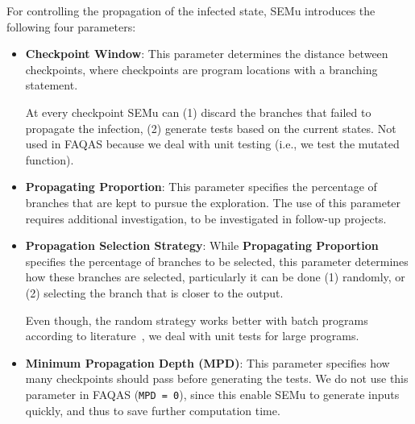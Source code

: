 \begin{itemize}
	
	For controlling the propagation of the infected state, SEMu introduces the following four parameters:
	\begin{itemize}

		\item \textbf{Checkpoint Window}: This parameter determines the distance between checkpoints, where checkpoints are program locations with a branching statement. 

		At every checkpoint SEMu can (1) discard the branches that failed to propagate the infection, (2) generate tests based on the current states. Not used in FAQAS because we deal with unit testing (i.e., we test the mutated function).
		
		\item \textbf{Propagating Proportion}: This parameter specifies the percentage of branches that are kept to pursue the exploration. The use of this parameter requires additional investigation, to be investigated in follow-up projects.


		\item \textbf{Propagation Selection Strategy}: While \textbf{Propagating Proportion} specifies the percentage of branches to be selected, this parameter determines how these branches are selected, particularly it can be done (1) randomly, or (2) selecting the branch that is closer to the output. 

		Even though, the random strategy works better with batch programs according to literature~\cite{chekam2021killing}, we deal with unit tests for large programs. 

		\item \textbf{Minimum Propagation Depth (MPD)}: This parameter specifies how many checkpoints should pass before generating the tests. We do not use this parameter in FAQAS (\texttt{MPD = 0}), since this enable SEMu to generate inputs quickly, and thus to save further computation time. 
	\end{itemize}


\end{itemize}
